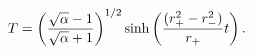 \begin{equation}
T = \left( \sqrt{\alpha} - 1 \over \sqrt{\alpha} + 1 \right)^{1/2}
\sinh  \left( {(r_+^2 - r_-^2) \over r_+} t \right).
\end{equation}


